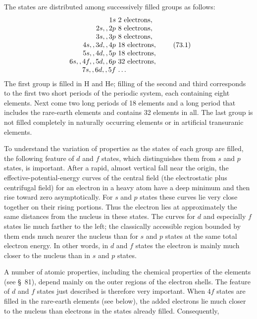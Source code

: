 The states are distributed among successively filled groups as follows:
\begin{equation}
\begin{array}{r@{\ }l}
1s&2\text{ electrons},\\
2s,,2p&8\text{ electrons},\\
3s,,3p&8\text{ electrons},\\
4s,,3d,,4p&18\text{ electrons},\\
5s,,4d,,5p&18\text{ electrons},\\
6s,,4f,,5d,,6p&32\text{ electrons},\\
7s,,6d,,5f&\ldots
\end{array}
\tag{73.1}
\end{equation}
The first group is filled in H and He; filling of the second and third corresponds to the first two short periods of the periodic system, each containing eight elements. Next come two long periods of 18 elements and a long period that includes the rare-earth elements and contains 32 elements in all. The last group is not filled completely in naturally occurring elements or in artificial transuranic elements.

To understand the variation of properties as the states of each group are filled, the following feature of $d$ and $f$ states, which distinguishes them from $s$ and $p$ states, is important. After a rapid, almost vertical fall near the origin, the effective-potential-energy curves of the central field (the electrostatic plus centrifugal field) for an electron in a heavy atom have a deep minimum and then rise toward zero asymptotically. For $s$ and $p$ states these curves lie very close together on their rising portions. Thus the electron lies at approximately the same distances from the nucleus in these states. The curves for $d$ and especially $f$ states lie much farther to the left; the classically accessible region bounded by them ends much nearer the nucleus than for $s$ and $p$ states at the same total electron energy. In other words, in $d$ and $f$ states the electron is mainly much closer to the nucleus than in $s$ and $p$ states.

A number of atomic properties, including the chemical properties of the elements (see \S~81), depend mainly on the outer regions of the electron shells. The feature of $d$ and $f$ states just described is therefore very important. When $4f$ states are filled in the rare-earth elements (see below), the added electrons lie much closer to the nucleus than electrons in the states already filled. Consequently,

